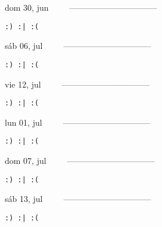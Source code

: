 \documentclass[letterpaper,10pt]{article}
\begin{document}
\begin{multicols}{3}
{dom 30, jun\ \ \ \ \ --------------------------------}
\begin{flushright}\begin{small}\texttt{:) :| :(}\end{small}\end{flushright}
\vfill
{sáb 06, jul\ \ \ \ \ --------------------------------}
\begin{flushright}\begin{small}\texttt{:) :| :(}\end{small}\end{flushright}\par
\vfill
{vie 12, jul\ \ \ \ \ --------------------------------}
\begin{flushright}\begin{small}\texttt{:) :| :(}\end{small}\end{flushright}\par
\vfill
\end{multicols}
\vspace{1.05cm}

\begin{multicols}{3}
{lun 01, jul\ \ \ \ \ --------------------------------}
\begin{flushright}\begin{small}\texttt{:) :| :(}\end{small}\end{flushright}
\vfill
{dom 07, jul\ \ \ \ \ --------------------------------}
\begin{flushright}\begin{small}\texttt{:) :| :(}\end{small}\end{flushright}\par
\vfill
{sáb 13, jul\ \ \ \ \ --------------------------------}
\begin{flushright}\begin{small}\texttt{:) :| :(}\end{small}\end{flushright}\par
\vfill
\end{multicols}
\vspace{1.05cm}
\end{document}
